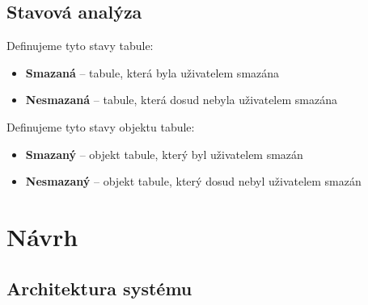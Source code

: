 






\subsection{Stavová analýza}
Definujeme tyto stavy tabule:
\begin{itemize}
	\item \textbf{Smazaná} -- tabule, která byla uživatelem smazána
	\item \textbf{Nesmazaná} -- tabule, která dosud nebyla uživatelem smazána
\end{itemize}

\noindent Definujeme tyto stavy objektu tabule:
\begin{itemize}
	\item \textbf{Smazaný} -- objekt tabule, který byl uživatelem smazán
	\item \textbf{Nesmazaný} -- objekt tabule, který dosud nebyl uživatelem smazán
\end{itemize}



\clearpage




\section{Návrh}
\label{sec:3.3}
\subsection{Architektura systému}
